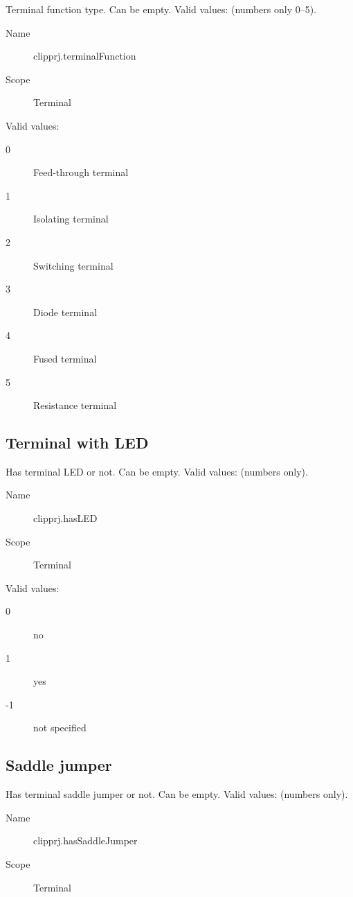 \documentclass[%
	a4paper,
	oneside,
	listof=numbered,
	parskip=half,
	headsepline=true,
	footsepline=false,
	normalheadings,
	0.7headlines,
	headexclude,
	]{scrbook}
\begin{document}
Terminal function type.
Can be empty.
Valid values: (numbers only 0--5).

\begin{description}
	\item[Name] clipprj.terminalFunction
	\item[Scope] Terminal
\end{description}

Valid values:

\begin{description}
	\item[0] Feed-through terminal
	\item[1] Isolating terminal
	\item[2] Switching terminal
	\item[3] Diode terminal
	\item[4] Fused terminal
	\item[5] Resistance terminal
\end{description}

\subsection{Terminal with LED}

Has terminal LED or not.
Can be empty.
Valid values: (numbers only).\\

\begin{description}
	\item[Name] clipprj.hasLED
	\item[Scope] Terminal
\end{description}

Valid values:

\begin{description}
	\item[0] no
	\item[1] yes
	\item[-1] not specified
\end{description}

\subsection{Saddle jumper}

Has terminal saddle jumper or not.
Can be empty.
Valid values: (numbers only).

\begin{description}
	\item[Name] clipprj.hasSaddleJumper
	\item[Scope] Terminal
\end{description}
\end{document}
